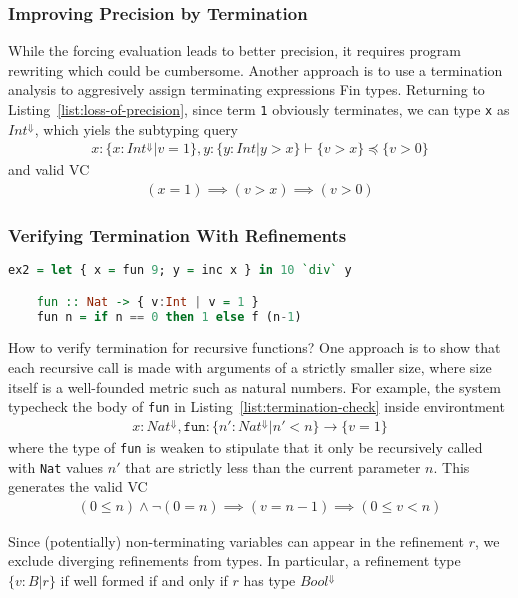 \documentclass[a4paper,UKenglish]{lipics-v2016}
\begin{document}
\subsubsection{Improving Precision by Termination}
While the forcing evaluation leads to better precision, it requires program
rewriting which could be cumbersome.  Another approach is to use a termination
analysis to aggresively assign terminating expressions Fin types.  Returning to
Listing~\ref{list:loss-of-precision}, since term \texttt{1} obviously
terminates, we can type \texttt{x} as $Int^{\Downarrow}$, which yiels the
subtyping query
\begin{align*}
    x:\{x:Int^{\Downarrow}|v=1\},y:\{y:Int|y>x\}\vdash\{v>x\}\preceq\{v>0\}
\end{align*}
and valid VC
\begin{align*}
    (x=1)\implies(v>x)\implies(v>0)
\end{align*}

\subsubsection{Verifying Termination With Refinements}
\begin{lstlisting}[caption={Verifying Termination},float,captionpos=t,label={list:termination-check},language=haskell,abovecaptionskip=-\medskipamount]
    ex2 = let { x = fun 9; y = inc x } in 10 `div` y

    fun :: Nat -> { v:Int | v = 1 }
    fun n = if n == 0 then 1 else f (n-1)
\end{lstlisting}
How to verify termination for recursive functions?  One approach is to show
that each recursive call is made with arguments of a strictly smaller size,
where size itself is a well-founded metric such as natural numbers.  For
example, the system typecheck the body of \texttt{fun} in
Listing~\ref{list:termination-check} inside environtment
\begin{align*}
    x:Nat^{\Downarrow}, \mathtt{fun}:\{n':Nat^{\Downarrow}|n'<n\}\rightarrow\{v=1\}
\end{align*}
where the type of \texttt{fun} is weaken to stipulate that it only be
recursively called with \texttt{Nat} values $n'$ that are strictly less than
the current parameter $n$.  This generates the valid VC
\begin{align*}
    (0\leq n)\wedge\neg(0=n)\implies(v=n-1)\implies(0\leq v<n)
\end{align*}

Since (potentially) non-terminating variables can appear in the refinement $r$,
we exclude diverging refinements from types.  In particular, a refinement type
$\{v:B|r\}$ if well formed if and only if $r$ has type $Bool^{\Downarrow}$
\end{document}
